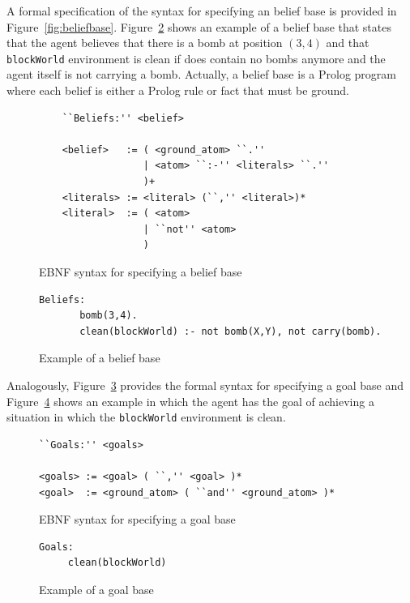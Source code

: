 \documentclass[a4paper]{article}
\begin{document}
A formal specification of the syntax for specifying an belief base is provided in Figure~\ref{fig:beliefbase}. Figure~\ref{fig:example_beliefbase} shows an example of a belief base that states that the agent believes that there is a bomb at position $(3,4)$ and that \texttt{blockWorld} environment is clean if does contain no bombs anymore and the agent itself is not carrying a bomb. Actually, a belief base is a Prolog program where each belief is either a Prolog rule or fact that must be ground.

\begin{figure}[htp]
\begin{verbatim}
	``Beliefs:'' <belief>
	
	<belief>   := ( <ground_atom> ``.''
	              | <atom> ``:-'' <literals> ``.'' 
	              )+
	<literals> := <literal> (``,'' <literal>)*
	<literal>  := ( <atom> 
	              | ``not'' <atom>
	              )
	\end{verbatim}
\caption{EBNF syntax for specifying a belief base}
\label{fig:ebnf_agent}
\end{figure}

\begin{figure}[htp]
\begin{verbatim}
Beliefs:
       bomb(3,4).
       clean(blockWorld) :- not bomb(X,Y), not carry(bomb).
\end{verbatim}
\caption{Example of a belief base}
\label{fig:example_beliefbase}
\end{figure}

Analogously, Figure~\ref{fig:ebnf_goalbase} provides the formal syntax for specifying a goal base and Figure~\ref{fig:example_goalbase} shows an example in which the agent has the goal of achieving a situation in which the \texttt{blockWorld} environment is clean. %

\begin{figure}[htp]
\begin{verbatim}
``Goals:'' <goals>

<goals> := <goal> ( ``,'' <goal> )*
<goal>  := <ground_atom> ( ``and'' <ground_atom> )*
\end{verbatim}
\caption{EBNF syntax for specifying a goal base}
\label{fig:ebnf_goalbase}
\end{figure}

\begin{figure}[htp]
\begin{verbatim}
Goals:
     clean(blockWorld)
\end{verbatim}
\caption{Example of a goal base}
\label{fig:example_goalbase}
\end{figure}
\end{document}
